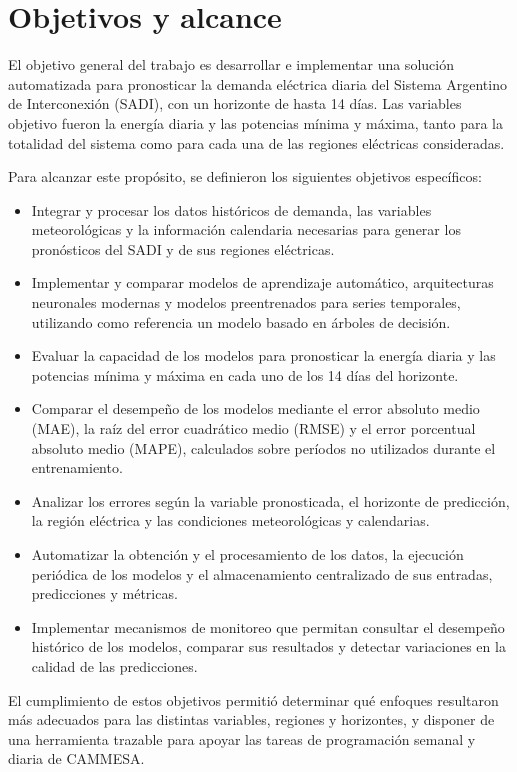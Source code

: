 \section{Objetivos y alcance}
\label{sec:objetivos}

El objetivo general del trabajo es desarrollar e implementar una solución automatizada para pronosticar la demanda eléctrica diaria del Sistema Argentino de Interconexión (SADI), con un horizonte de hasta 14 días. Las variables objetivo fueron la energía diaria y las potencias mínima y máxima, tanto para la totalidad del sistema como para cada una de las regiones eléctricas consideradas.

Para alcanzar este propósito, se definieron los siguientes objetivos específicos:

\begin{itemize}
	
	\item Integrar y procesar los datos históricos de demanda, las variables meteorológicas y la información calendaria necesarias para generar los pronósticos del SADI y de sus regiones eléctricas.
	
	\item Implementar y comparar modelos de aprendizaje automático, arquitecturas neuronales modernas y modelos preentrenados para series temporales, utilizando como referencia un modelo basado en árboles de decisión.
	
	\item Evaluar la capacidad de los modelos para pronosticar la energía diaria y las potencias mínima y máxima en cada uno de los 14 días del horizonte.
	
	\item Comparar el desempeño de los modelos mediante el error absoluto medio (MAE), la raíz del error cuadrático medio (RMSE) y el error porcentual absoluto medio (MAPE), calculados sobre períodos no utilizados durante el entrenamiento.
	
	\item Analizar los errores según la variable pronosticada, el horizonte de predicción, la región eléctrica y las condiciones meteorológicas y calendarias.
	
	\item Automatizar la obtención y el procesamiento de los datos, la ejecución periódica de los modelos y el almacenamiento centralizado de sus entradas, predicciones y métricas.
	
	\item Implementar mecanismos de monitoreo que permitan consultar el desempeño histórico de los modelos, comparar sus resultados y detectar variaciones en la calidad de las predicciones.
	
\end{itemize}

El cumplimiento de estos objetivos permitió determinar qué enfoques resultaron más adecuados para las distintas variables, regiones y horizontes, y disponer de una herramienta trazable para apoyar las tareas de programación semanal y diaria de CAMMESA.